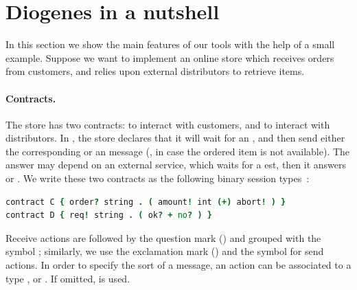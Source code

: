 \section{Diogenes in a nutshell}

In this section we show the main features of our tools
with the help of a small example.
Suppose we want to implement an online store which 
receives orders from customers,
and relies upon external distributors to retrieve items.

\paragraph{Contracts.}
The store has two contracts:
 to interact with customers, and
 to interact with distributors.
In , the store declares that it will wait for an ,
and then send either the corresponding  or an  message
(\eg, in case the ordered item is not available).
The answer may depend on an external service, 
which waits for a est, then it answers  or .
% 
We write these two contracts as the following 
binary session types~\cite{Honda98esop}:
% 
\begin{lstlisting}[language=coco,basicstyle=\scriptsize\ttfamily]
contract C { order? string . ( amount! int (+) abort! ) }
contract D { req! string . ( ok? + no? ) }
\end{lstlisting}
Receive actions are followed by the question mark () and grouped
with the symbol \code{+}; similarly, we use the
exclamation mark (\code{!}) and the symbol \code{(+)} for
send actions. 
In order to specify the sort of a message, 
an action can be associated to a type
,  or .
If omitted,  is used.
 


